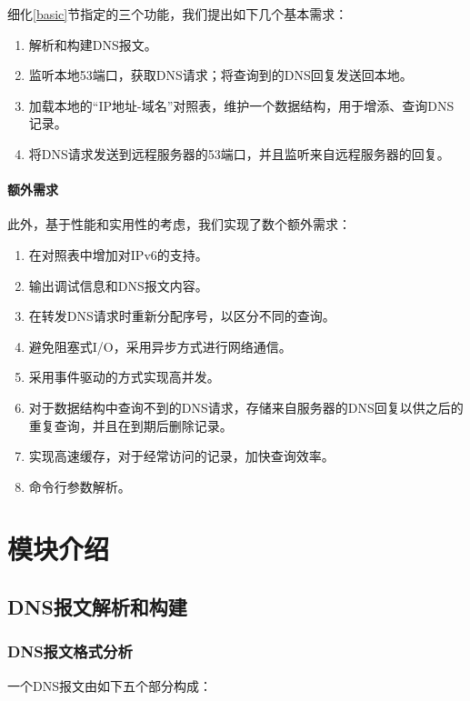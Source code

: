\documentclass[lang=cn,11pt,a4paper,cite=authornum]{paper}
\begin{document}
细化\ref{basic}节指定的三个功能，我们提出如下几个基本需求：

\begin{enumerate}
    \item 解析和构建DNS报文。
    \item 监听本地53端口，获取DNS请求；将查询到的DNS回复发送回本地。
    \item 加载本地的“IP地址-域名”对照表，维护一个数据结构，用于增添、查询DNS记录。
    \item 将DNS请求发送到远程服务器的53端口，并且监听来自远程服务器的回复。
\end{enumerate}

\paragraph{额外需求}

此外，基于性能和实用性的考虑，我们实现了数个额外需求：

\begin{enumerate}
    \item 在对照表中增加对IPv6的支持。
    \item 输出调试信息和DNS报文内容。
    \item 在转发DNS请求时重新分配序号，以区分不同的查询。
    \item 避免阻塞式I/O，采用异步方式进行网络通信。
    \item 采用事件驱动的方式实现高并发。
    \item 对于数据结构中查询不到的DNS请求，存储来自服务器的DNS回复以供之后的重复查询，并且在到期后删除记录。
    \item 实现高速缓存，对于经常访问的记录，加快查询效率。
    \item 命令行参数解析。
\end{enumerate}

\section{模块介绍}

\subsection{DNS报文解析和构建}

\subsubsection{DNS报文格式分析}

一个DNS报文由如下五个部分构成：
\end{document}
